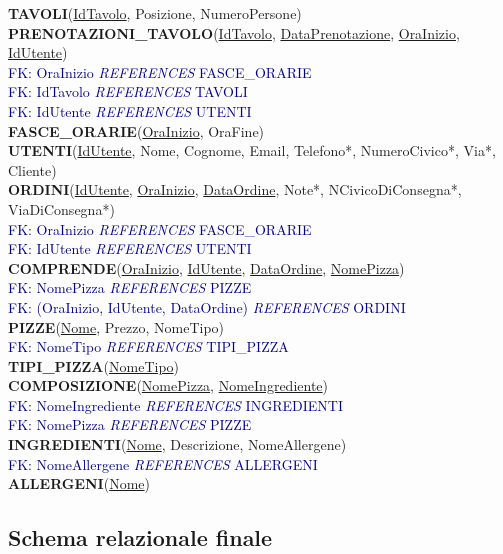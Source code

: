 \documentclass[a4paper,12pt, oneside]{article}
\begin{document}
\textbf{TAVOLI}(\underline{IdTavolo}, Posizione, NumeroPersone) \\
\textbf{PRENOTAZIONI\_TAVOLO}(\underline{IdTavolo}, \underline{DataPrenotazione}, \underline{OraInizio}, \underline{IdUtente}) \\
\textcolor{darkBlue}{FK: OraInizio \textit{REFERENCES} FASCE\_ORARIE} \\
\textcolor{darkBlue}{FK: IdTavolo \textit{REFERENCES} TAVOLI} \\
\textcolor{darkBlue}{FK: IdUtente \textit{REFERENCES} UTENTI} \\
\textbf{FASCE\_ORARIE}(\underline{OraInizio}, OraFine) \\
\textbf{UTENTI}(\underline{IdUtente}, Nome, Cognome, Email, Telefono*, NumeroCivico*, Via*, Cliente) \\
\textbf{ORDINI}(\underline{IdUtente}, \underline{OraInizio}, \underline{DataOrdine}, Note*, NCivicoDiConsegna*, ViaDiConsegna*) \\
\textcolor{darkBlue}{FK: OraInizio \textit{REFERENCES} FASCE\_ORARIE} \\
\textcolor{darkBlue}{FK: IdUtente \textit{REFERENCES} UTENTI} \\
\textbf{COMPRENDE}(\underline{OraInizio}, \underline{IdUtente}, \underline{DataOrdine}, \underline{NomePizza}) \\
\textcolor{darkBlue}{FK: NomePizza \textit{REFERENCES} PIZZE} \\
\textcolor{darkBlue}{FK: (OraInizio, IdUtente, DataOrdine) \textit{REFERENCES} ORDINI} \\
\textbf{PIZZE}(\underline{Nome}, Prezzo, NomeTipo) \\
\textcolor{darkBlue}{FK: NomeTipo \textit{REFERENCES} TIPI\_PIZZA} \\
\textbf{TIPI\_PIZZA}(\underline{NomeTipo}) \\
\textbf{COMPOSIZIONE}(\underline{NomePizza}, \underline{NomeIngrediente}) \\
\textcolor{darkBlue}{FK: NomeIngrediente \textit{REFERENCES} INGREDIENTI} \\
\textcolor{darkBlue}{FK: NomePizza \textit{REFERENCES} PIZZE} \\
\textbf{INGREDIENTI}(\underline{Nome}, Descrizione, NomeAllergene) \\
\textcolor{darkBlue}{FK: NomeAllergene \textit{REFERENCES} ALLERGENI} \\
\textbf{ALLERGENI}(\underline{Nome})

\newpage
\subsection{Schema relazionale finale}
\end{document}
